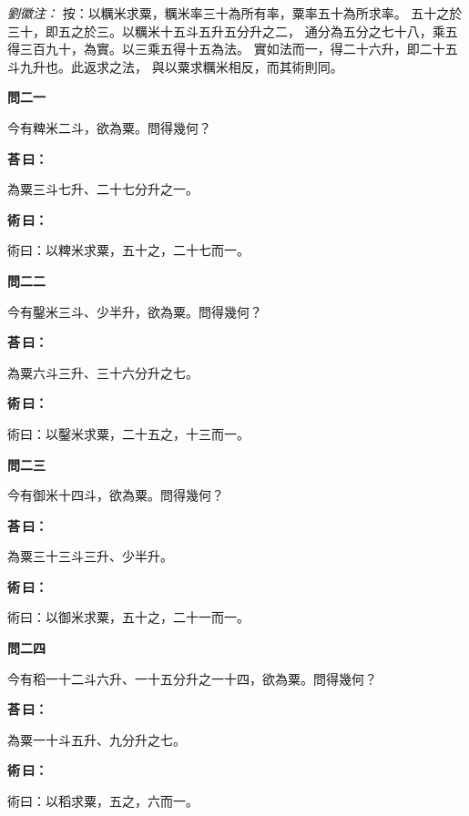 \documentclass[11pt,a4paper]{article}
\newenvironment{problem}[1][]{%
  \par\vspace{0.6em}\noindent\textcolor{problemcolor}{\textbf{問\ignorespaces#1\unskip}\hspace{0.5em}}%
  \ignorespaces
}{\par\vspace{0.4em}}
\newenvironment{answer}{%
  \par\noindent\textcolor{answercolor}{\textbf{荅\,曰：}}%
  \ignorespaces
}{\par\vspace{0.3em}}
\newenvironment{method}{%
  \par\noindent\textcolor{methodcolor}{\textbf{術\,曰：}}%
  \ignorespaces
}{\par\vspace{0.4em}}
\newenvironment{liuhuicomm}{%
  \par\vspace{0.3em}\noindent\textcolor{commentarycolor}{\small\textit{劉徽注：}}}%
  {\par\vspace{0.5em}}
\begin{document}
\begin{liuhuicomm}
按：以糲米求粟，糲米率三十為所有率，粟率五十為所求率。
五十之於三十，即五之於三。以糲米十五斗五升五分升之二，
通分為五分之七十八，乘五得三百九十，為實。以三乘五得十五為法。
實如法而一，得二十六升，即二十五斗九升也。此返求之法，
與以粟求糲米相反，而其術則同。
\end{liuhuicomm}

\begin{problem}[二一]
今有粺米二斗，欲為粟。問得幾何？
\end{problem}

\begin{answer}
為粟三斗七升、二十七分升之一。
\end{answer}

\begin{method}
術曰：以粺米求粟，五十之，二十七而一。
\end{method}

\begin{problem}[二二]
今有鑿米三斗、少半升，欲為粟。問得幾何？
\end{problem}

\begin{answer}
為粟六斗三升、三十六分升之七。
\end{answer}

\begin{method}
術曰：以鑿米求粟，二十五之，十三而一。
\end{method}

\begin{problem}[二三]
今有御米十四斗，欲為粟。問得幾何？
\end{problem}

\begin{answer}
為粟三十三斗三升、少半升。
\end{answer}

\begin{method}
術曰：以御米求粟，五十之，二十一而一。
\end{method}

\begin{problem}[二四]
今有稻一十二斗六升、一十五分升之一十四，欲為粟。問得幾何？
\end{problem}

\begin{answer}
為粟一十斗五升、九分升之七。
\end{answer}

\begin{method}
術曰：以稻求粟，五之，六而一。
\end{method}
\end{document}
